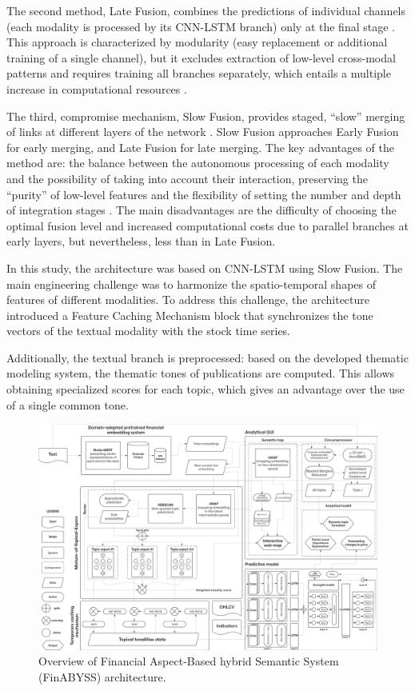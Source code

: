 The second method, Late Fusion, combines the predictions of individual channels (each modality is processed by its
CNN-LSTM branch) only at the final stage \parencite{Karpathy_2014_CVPR, ortega2019multimodal}. This approach is characterized
by modularity (easy replacement or additional training of a single channel), but it excludes extraction of low-level
cross-modal patterns and requires training all branches separately, which entails a multiple increase in computational
resources \parencite{joze2020mmtm}.

The third, compromise mechanism, Slow Fusion, provides staged, “slow” merging of links at different layers of the network
\parencite{feichtenhofer2016convolutional, dutt2022shared}. Slow Fusion approaches Early Fusion for early merging, and Late Fusion
for late merging. The key advantages of the method are: the balance between the autonomous processing of each modality
and the possibility of taking into account their interaction, preserving the “purity” of low-level features and
the flexibility of setting the number and depth of integration stages \parencite{Karpathy_2014_CVPR}. The main disadvantages
are the difficulty of choosing the optimal fusion level and increased computational costs due to parallel branches
at early layers, but nevertheless, less than in Late Fusion.

In this study, the architecture was based on CNN-LSTM using Slow Fusion. The main engineering challenge was to harmonize
the spatio-temporal shapes of features of different modalities. To address this challenge, the architecture introduced
a Feature Caching Mechanism block that synchronizes the tone vectors of the textual modality with the stock time series.

Additionally, the textual branch is preprocessed: based on the developed thematic modeling system, the thematic tones
of publications are computed. This allows obtaining specialized scores for each topic, which gives an advantage over
the use of a single common tone.

\begin{figure}[H]
    \centering
    \includegraphics[width=1\linewidth]{img/architecture_overview.png}
    \caption{Overview of Financial Aspect-Based hybrid Semantic System (FinABYSS) architecture.}
    \label{fig:architecture_overview}
\end{figure}

